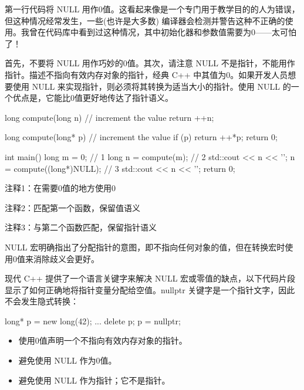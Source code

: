 第一行代码将 NULL 用作0值。这看起来像是一个专门用于教学目的的人为错误，但这种情况经常发生，一些(也许是大多数) 编译器会检测并警告这种不正确的使用。我曾在代码库中看到过这种情况，其中初始化器和参数值需要为0——太可怕了！


首先，不要将 NULL 用作巧妙的0值。其次，请注意 NULL 不是指针，不能用作指针。描述不指向有效内存对象的指针，经典 C++ 中其值为0。如果开发人员想要使用 NULL 来实现指针，则必须将其转换为适当大小的指针。使用 NULL 的一个优点是，它能比0值更好地传达了指针语义。


\begin{cpp}
long compute(long n) { // increment the value
  return ++n;
}

long compute(long* p) { // increment the value
  if (p)
    return ++*p;
  return 0;
}

int main() {
  long m = 0; // 1
  long n = compute(m); // 2
  std::cout << n << '\n';
  n = compute((long*)NULL); // 3
  std::cout << n << '\n';
  return 0;
}
\end{cpp}

{\footnotesize
注释1：在需要0值的地方使用0

注释2：匹配第一个函数，保留值语义

注释3：与第二个函数匹配，保留指针语义
}

NULL 宏明确指出了分配指针的意图，即不指向任何对象的值，但在转换宏时使用0值来消除歧义会更好。

现代 C++ 提供了一个语言关键字来解决 NULL 宏或零值的缺点，以下代码片段显示了如何正确地将指针变量分配给空值。nullptr 关键字是一个指针文字，因此不会发生隐式转换：

\begin{cpp}
long* p = new long(42);
...
delete p;
p = nullptr;
\end{cpp}


\begin{itemize}
\item
使用0值声明一个不指向有效内存对象的指针。

\item
避免使用 NULL 作为0值。

\item
避免使用 NULL 作为指针；它不是指针。
\end{itemize}












